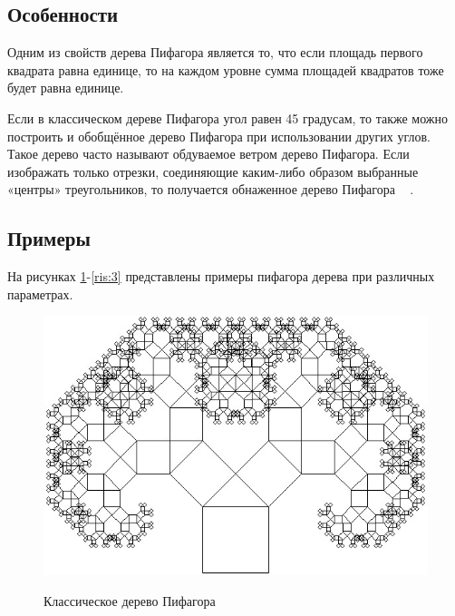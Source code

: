 \documentclass[a4paper,12pt]{article}
\begin{document}
	
	
	\subsection{Особенности}
	
	Одним из свойств дерева Пифагора является то, что если площадь первого квадрата равна единице, то на каждом уровне сумма площадей квадратов тоже будет равна единице.
	
	Если в классическом дереве Пифагора угол равен 45 градусам, то также можно построить и обобщённое дерево Пифагора при использовании других углов. Такое дерево часто называют обдуваемое ветром дерево Пифагора. Если изображать только отрезки, соединяющие каким-либо образом выбранные «центры» треугольников, то получается обнаженное дерево Пифагора ~\cite{tree} .

	\subsection{Примеры}
	
	На рисунках \ref{ris:1}-\ref{ris:3} представлены примеры пифагора дерева при различных параметрах.
	
	\begin{figure}[h!]
		\begin{center}
			{\includegraphics[scale = 0.5]{Classic.jpg}}
			\caption{Классическое дерево Пифагора}
			\label{ris:1}
		\end{center}
	\end{figure}
\end{document}
